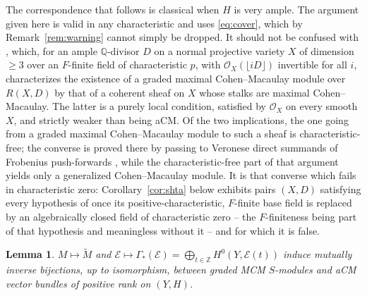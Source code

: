 \documentclass[11pt]{amsart}
\newtheorem{lemma}[theorem]{Lemma}
\theoremstyle{remark}
\theoremstyle{definition}
\newcommand{\ZZ}{\mathbb{Z}}
\newcommand{\QQ}{\mathbb{Q}}
\newcommand{\cO}{\mathcal{O}}
\newcommand{\cE}{\mathcal{E}}
\begin{document}
The correspondence that follows is classical when $H$ is very ample. The argument given here is valid in any characteristic and uses \eqref{eq:cover}, which by Remark~\ref{rem:warning} cannot simply be dropped. It should not be confused with \cite[Cor.~4.5(i)]{ShTa}, which, for an ample $\QQ$-divisor $D$ on a normal projective variety $X$ of dimension $\ge3$ over an $F$-finite field of characteristic $p$, with $\cO_X(\lfloor iD\rfloor)$ invertible for all $i$, characterizes the existence of a graded maximal Cohen--Macaulay module over $R(X,D)$ by that of a coherent sheaf on $X$ whose stalks are maximal Cohen--Macaulay. The latter is a purely local condition, satisfied by $\cO_X$ on every smooth $X$, and strictly weaker than being aCM. Of the two implications, the one going from a graded maximal Cohen--Macaulay module to such a sheaf is characteristic-free; the converse is proved there by passing to Veronese direct summands of Frobenius push-forwards \cite[Prop.~4.1]{ShTa}, while the characteristic-free part of that argument \cite[Lem.~4.4]{ShTa} yields only a generalized Cohen--Macaulay module. It is that converse which fails in characteristic zero: Corollary~\ref{cor:shta} below exhibits pairs $(X,D)$ satisfying every hypothesis of \cite[Cor.~4.5(i)]{ShTa} once its positive-characteristic, $F$-finite base field is replaced by an algebraically closed field of characteristic zero -- the $F$-finiteness being part of that hypothesis and meaningless without it -- and for which it is false.

\begin{lemma}\label{lem:mcm}
$M\mapsto\widetilde M$ and $\cE\mapsto\Gamma_*(\cE)=\bigoplus_{t\in\ZZ}H^0(Y,\cE(t))$ induce mutually inverse bijections, up to isomorphism, between graded MCM $S$-modules and aCM vector bundles of positive rank on $(Y,H)$.
\end{lemma}
\end{document}
